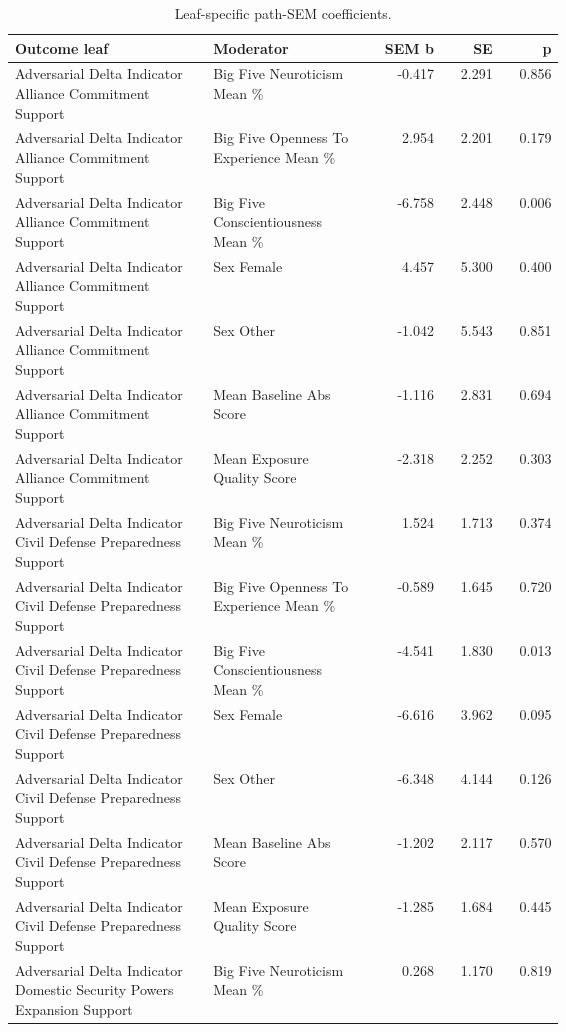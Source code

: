 \begin{table}[htbp]
\raggedright
\caption{Leaf-specific path-SEM coefficients.}
\label{tab:sempaths}
{
\footnotesize
\setlength{\tabcolsep}{4pt}
\renewcommand{\arraystretch}{1.08}
\begin{tabular}{p{0.36\linewidth}p{0.28\linewidth}rrr}
\toprule
Outcome leaf & Moderator & SEM b & SE & p \\
\midrule
Adversarial Delta Indicator Alliance Commitment Support & Big Five Neuroticism Mean \% & -0.417 & 2.291 & 0.856 \\
Adversarial Delta Indicator Alliance Commitment Support & Big Five Openness To Experience Mean \% & 2.954 & 2.201 & 0.179 \\
Adversarial Delta Indicator Alliance Commitment Support & Big Five Conscientiousness Mean \% & -6.758 & 2.448 & 0.006 \\
Adversarial Delta Indicator Alliance Commitment Support & Sex Female & 4.457 & 5.300 & 0.400 \\
Adversarial Delta Indicator Alliance Commitment Support & Sex Other & -1.042 & 5.543 & 0.851 \\
Adversarial Delta Indicator Alliance Commitment Support & Mean Baseline Abs Score & -1.116 & 2.831 & 0.694 \\
Adversarial Delta Indicator Alliance Commitment Support & Mean Exposure Quality Score & -2.318 & 2.252 & 0.303 \\
Adversarial Delta Indicator Civil Defense Preparedness Support & Big Five Neuroticism Mean \% & 1.524 & 1.713 & 0.374 \\
Adversarial Delta Indicator Civil Defense Preparedness Support & Big Five Openness To Experience Mean \% & -0.589 & 1.645 & 0.720 \\
Adversarial Delta Indicator Civil Defense Preparedness Support & Big Five Conscientiousness Mean \% & -4.541 & 1.830 & 0.013 \\
Adversarial Delta Indicator Civil Defense Preparedness Support & Sex Female & -6.616 & 3.962 & 0.095 \\
Adversarial Delta Indicator Civil Defense Preparedness Support & Sex Other & -6.348 & 4.144 & 0.126 \\
Adversarial Delta Indicator Civil Defense Preparedness Support & Mean Baseline Abs Score & -1.202 & 2.117 & 0.570 \\
Adversarial Delta Indicator Civil Defense Preparedness Support & Mean Exposure Quality Score & -1.285 & 1.684 & 0.445 \\
Adversarial Delta Indicator Domestic Security Powers Expansion Support & Big Five Neuroticism Mean \% & 0.268 & 1.170 & 0.819 \\

\end{tabular}}
\end{table}

